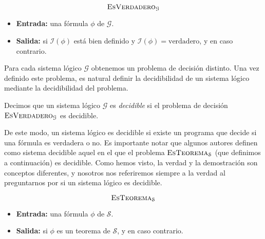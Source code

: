 \vspace{8pt}
\begin{problema}
\begin{framed}
$$\text{\textsc{EsVerdadero}}_\mathcal{G}$$

\begin{itemize}
    \item \textbf{Entrada:} una fórmula $\phi$ de $\mathcal{G}$.
    \item \textbf{Salida:}  si $\mathcal{I}(\phi)$ está bien definido y $\mathcal{I}(\phi)=\text{verdadero}$, y  en caso contrario.
\end{itemize}
\end{framed}
\caption{$\text{\textsc{EsVerdadero}}_\mathcal{G}$}
\label{prob:es-verdadero}
\end{problema}

Para cada sistema lógico $\mathcal{G}$ obtenemos un problema de decisión distinto. Una vez definido este problema, es natural definir la decidibilidad de un sistema lógico mediante la decidibilidad del problema.

\begin{definicion}\label{def:decidibilidad-sl}
Decimos que un sistema lógico $\mathcal{G}$ es \emph{decidible} si el problema de decisión $\text{\textsc{EsVerdadero}}_\mathcal{G}$ es decidible.
\end{definicion}

De este modo, un sistema lógico es decidible si existe un programa que decide si una fórmula es verdadera o no. Es importante notar que algunos autores definen como sistema decidible aquel en el que el problema $\text{\textsc{EsTeorema}}_\mathcal{S}$ (que definimos a continuación) es decidible. Como hemos visto, la verdad y la demostración son conceptos diferentes, y nosotros nos referiremos siempre a la verdad al preguntarnos por si un sistema lógico es decidible.
\vspace{8pt}
\begin{problema}
\begin{framed}
$$\text{\textsc{EsTeorema}}_\mathcal{S}$$

\begin{itemize}
    \item \textbf{Entrada:} una fórmula $\phi$ de $\mathcal{S}$.
    \item \textbf{Salida:}  si $\phi$ es un teorema de $\mathcal{S}$, y  en caso contrario.
\end{itemize}
\end{framed}
\caption{$\text{\textsc{EsTeorema}}_\mathcal{S}$}
\label{prob:es-teorema}
\end{problema}

